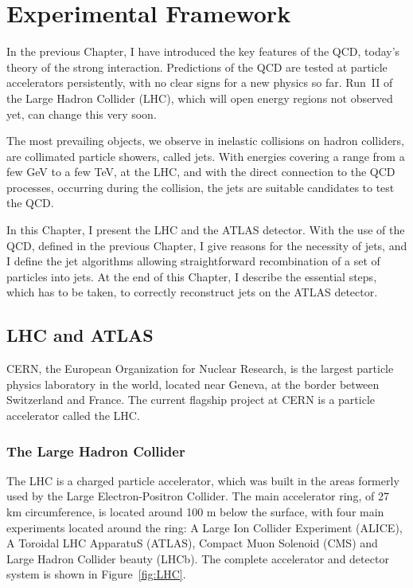 \chapter{Experimental Framework}


In the previous Chapter, I have introduced the key features of the QCD, today's
theory of the strong interaction. Predictions of the QCD are tested at particle
accelerators persistently, with no clear signs for a new physics so far. 
Run~II of the Large Hadron Collider (LHC), which will open energy regions not
observed yet, can change this very soon.

The most prevailing objects, we observe in inelastic collisions on hadron
colliders, are collimated particle showers, called jets. With energies covering
a range from a few GeV to a few TeV, at the LHC, and with the
direct connection to the QCD processes, occurring during the collision, the jets
are suitable candidates to test the QCD.

In this Chapter, I present the LHC and the ATLAS detector.
With the use of the QCD, defined in the previous Chapter, I give reasons for the
necessity of jets, and I define the jet algorithms allowing straightforward
recombination of a set of particles into jets.
At the end of this Chapter, I describe the essential
steps, which has to be taken, to correctly reconstruct jets on the ATLAS
detector.

\section{LHC and ATLAS}

CERN, the European Organization for Nuclear Research, is the largest particle
physics laboratory in the world, located near Geneva, at the border between
Switzerland and France. The current flagship project at CERN is a particle
accelerator called the LHC.

\subsection{The Large Hadron Collider}

The LHC \cite{LHC, LHCPastPresentFuture} is a charged
particle accelerator, which was built in the areas formerly used by the Large
Electron-Positron Collider.  The main accelerator ring, of 27 km circumference,
is located around 100 m below the surface, with four main experiments located
around the ring: A Large Ion Collider Experiment (ALICE), A Toroidal LHC
ApparatuS (ATLAS), Compact Muon Solenoid (CMS) and Large Hadron Collider beauty
(LHCb). The complete accelerator and detector system is shown in
Figure~\ref{fig:LHC}.


